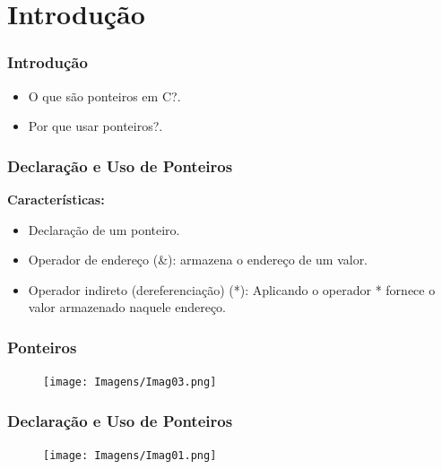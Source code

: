 \section{Introdução}

\begin{frame}

\frametitle{Introdução}

\begin{itemize}
  \item O que são ponteiros em C?.
  \item Por que usar ponteiros?.
\end{itemize}


\end{frame}



\begin{frame}
\frametitle{Declaração e Uso de Ponteiros}

\vspace{0.5cm}

\textbf{Características:}

\begin{itemize}
\item Declaração de um ponteiro.
\item Operador de endereço (\&): armazena o endereço de um valor.
\item Operador indireto (dereferenciação) (*): Aplicando o
operador * fornece o valor armazenado naquele endereço.
\end{itemize}

\vspace{0.5cm}


\end{frame}


\begin{frame}
\frametitle{Ponteiros}

	\begin{figure}[h]
		\centering
		\texttt{[image: Imagens/Imag03.png]}
	\end{figure}


\end{frame}


\begin{frame}
\frametitle{Declaração e Uso de Ponteiros}

	\begin{figure}[h]
		\centering
		\texttt{[image: Imagens/Imag01.png]}
	\end{figure}


\end{frame}


